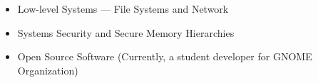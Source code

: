 
{\fontsize{9pt}{1em}\bodyfont\upshape\color{text}
\begin{itemize}[leftmargin=12pt]
    \setlength\itemsep{-3pt}
    \item Low-level Systems --- File Systems and Network
    \item Systems Security and Secure Memory Hierarchies
    \item Open Source Software (Currently, a student developer for GNOME Organization)
\end{itemize}
}
